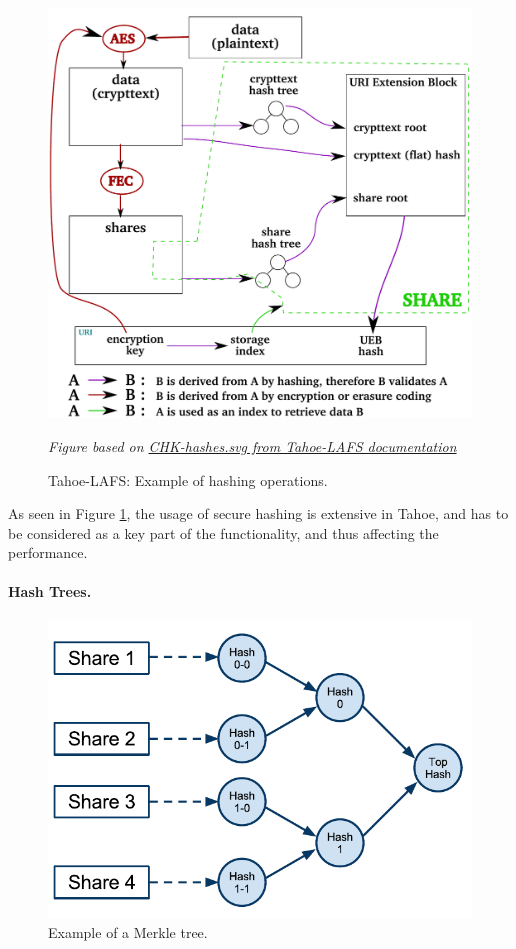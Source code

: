 \documentclass[english,12pt,a4paper]{book}
\begin{document}
\begin{figure}[!h]
    \centering
    \includegraphics[width=0.9\columnwidth]{Tahoe-hashes.pdf}
    \caption{Tahoe-LAFS: Example of hashing operations.}
    \label{fig:tahoehashing}
    \emph{Figure based on
     \href{http://tahoe-lafs.org/source/tahoe/trunk/docs/specifications/CHK-hashes.svg}
     {CHK-hashes.svg from Tahoe-LAFS documentation}}
\end{figure}

As seen in Figure \ref{fig:tahoehashing}, the usage of secure hashing is
extensive in Tahoe, and has to be considered as a key part of the functionality,
and thus affecting the performance.

\paragraph{Hash Trees.}

\begin{figure}[h]
    \centering
    \includegraphics[width=0.9\columnwidth]{Tahoe-MerkleTree.pdf}
    \caption{Example of a Merkle tree.}
    \label{fig:tahoemerkletree}
\end{figure}
\end{document}
